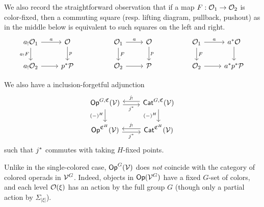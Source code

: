 \documentclass[a4paper,10pt
,draft
]{article}%
\renewcommand{\1}{\eta}%
\begin{document}
\begin{remark}
      \label{COLOR_SQUARE_REM}
      We also record the straightforward observation that if a map $F: \mathcal{O}_1 \to \mathcal{O}_2$ is color-fixed, then
      a commuting square (resp. lifting diagram, pullback, pushout) as in the middle below is
      equivalent to such squares on the left and right.
      \begin{equation}
            \label{COLOR_SQ_EQ}
            \begin{tikzcd}
                  a_! \O_1 \arrow[d, "a_! F"'] \arrow[r, "a"]
                  &
                  \O \arrow[d, "p"]
                  &&
                  \O_1 \arrow[d, "F"] \arrow[r, "a"]
                  &
                  \O \arrow[d, "p"]
                  &&
                  \O_1 \arrow[d, "F"] \arrow[r, "a"]
                  &
                  a^{\**} \O \arrow[d]
                  \\
                  a_! \O_2 \arrow[r]
                  &
                  p^{\**} \P
                  &&
                  \O_2 \arrow[r]
                  &
                  \P
                  &&
                  \O_2 \arrow[r]
                  &
                  a^{\**} p^{\**} \P
            \end{tikzcd}
      \end{equation}
\end{remark}

\begin{remark}
      We also have a inclusion-forgetful adjunction
      \begin{equation}
            \label{JSTAR_CAT_EQ}
            \begin{tikzcd}
                  \Op^{G, \mathfrak C}(\V) \arrow[r, shift right, "j^{\**}"'] \arrow[d, "{(-)^H}"']
                  &
                  \Cat^{G, \mathfrak C}(\V) \arrow[l, shift right, "j_!"'] \arrow[d, "{(-)^H}"']
                  \\
                  \Op^{\mathfrak C^H}(\V)  \arrow[r, shift right, "j^{\**}"']
                  &
                  \Cat^{\mathfrak C^H}(\V) \arrow[l, shift right, "j_!"']
            \end{tikzcd}
      \end{equation}
      such that $j^{\**}$ commutes with taking $H$-fixed points.
\end{remark}


\begin{remark}
	Unlike in the single-colored case, $\mathsf{Op}^G(\mathcal V)$ does \textit{not} coincide with the category of colored operads in $\mathcal V^G$.
	Indeed, objects in $\mathsf{Op}(\mathcal V^G)$ have a fixed $G$-set of colors,
        and each level $\mathcal{O}(\xi)$ has an action by the full group $G$
	(though only a partial action by $\Sigma_{|\xi|}$).
\end{remark}
\end{document}

